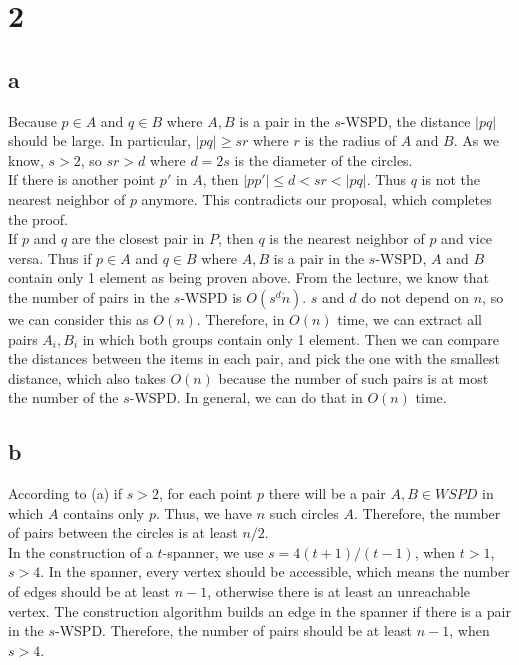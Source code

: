 \section*{2}
\subsection*{a}

Because $p \in A$ and $q \in B$ where ${A,B}$ is a pair in the $s$-WSPD, the distance $|pq|$ should be large. In particular, $|pq| \geq sr$ where $r$ is the radius of $A$ and $B$. As we know, $s > 2$, so $sr > d$ where $d = 2s$ is the diameter of the circles. \\

If there is another point $p'$ in $A$, then $|pp'| \leq d < sr < |pq|$. Thus $q$ is not the nearest neighbor of $p$ anymore. This contradicts our proposal, which completes the proof.\\

If $p$ and $q$ are the closest pair in $P$, then $q$ is the nearest neighbor of $p$ and vice versa. Thus if $p \in A$ and $q \in B$ where ${A,B}$ is a pair in the $s$-WSPD, $A$ and $B$ contain only 1 element as being proven above. From the lecture, we know that the number of pairs in the $s$-WSPD is $O(s^d \dot n)$. $s$ and $d$ do not depend on $n$, so we can consider this as $O(n)$. Therefore, in $O(n)$ time, we can extract all pairs ${A_i, B_i}$ in which both groups contain only 1 element. Then we can compare the distances between the items in each pair, and pick the one with the smallest distance, which also takes $O(n)$ because the number of such pairs is at most the number of the $s$-WSPD. In general, we can do that in $O(n)$ time.\\

\subsection*{b}
According to (a) if $s > 2$, for each point $p$ there will be a pair ${A,B} \in WSPD$ in which $A$ contains only $p$.
Thus, we have $n$ such circles $A$. Therefore, the number of pairs between the circles is at least $n/2$. \\

In the construction of a $t$-spanner, we use $s = 4(t + 1) / (t - 1)$, when $t > 1$, $s > 4$.
In the spanner, every vertex should be accessible, which means the number of edges
should be at least $n - 1$, otherwise there is at least an unreachable vertex.
The construction algorithm builds an edge in the spanner if there is a pair in
the $s$-WSPD. Therefore, the number of pairs should be at least $n - 1$, when $s > 4$. \\


